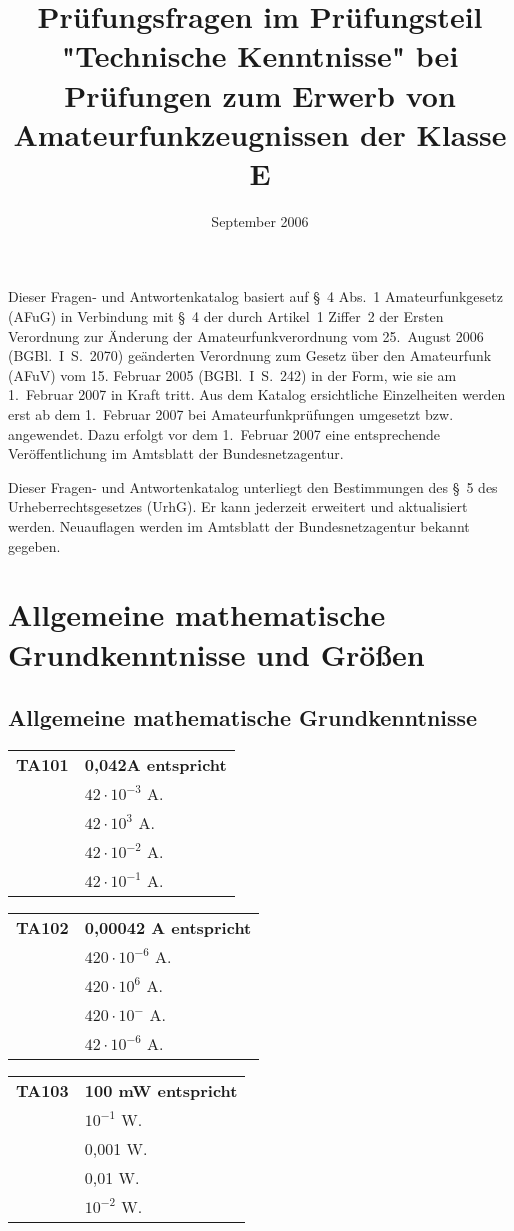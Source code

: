 \documentclass[
  ngerman,
  paper=a4,
  10pt,
  headings=small,
  DIV=15,
]{scrartcl}
\title{Prüfungsfragen im Prüfungsteil "Technische Kenntnisse" bei Prüfungen zum Erwerb von Amateurfunkzeugnissen der Klasse E}
\date{September 2006}
\makeatletter
\newenvironment{question}[2]{
  \noindent
  \setcounter{answer}{1}
  \begin{tabular}{@{}cp{6.5cm}@{}}
  \textbf{#1} & \textbf{#2}\\
}{
  \end{tabular}
  \bigskip
}
\newcounter{answer}
\newcommand{\answer}[1]{
  \textbf{\Alph{answer}}
  \stepcounter{answer}
  & #1\\}
\makeatother
\begin{document}
  \maketitle
    
  \newpage
  \vspace*{\fill}
  \noindent
  Dieser Fragen- und Antwortenkatalog basiert auf §~4 Abs.~1 Amateurfunkgesetz (AFuG) in Verbindung mit §~4 der durch Artikel~1 Ziffer~2 der Ersten Verordnung zur Änderung der Amateurfunkverordnung vom 25.~August 2006 (BGBl.~I~S.~2070) geänderten Verordnung zum Gesetz über den Amateurfunk (AFuV) vom 15. Februar 2005 (BGBl.~I~S.~242) in der Form, wie sie am 1.~Februar 2007 in Kraft tritt. Aus dem Katalog ersichtliche Einzelheiten werden erst ab dem 1.~Februar 2007 bei Amateurfunkprüfungen umgesetzt bzw. angewendet. Dazu erfolgt vor dem 1.~Februar 2007 eine entsprechende Veröffentlichung im Amtsblatt der Bundesnetzagentur.
  
Dieser Fragen- und Antwortenkatalog unterliegt den Bestimmungen des §~5 des Urheberrechtsgesetzes (UrhG).
Er kann jederzeit erweitert und aktualisiert werden. Neuauflagen werden im Amtsblatt der Bundesnetzagentur bekannt gegeben.
  \newpage
  \tableofcontents
  \twocolumn
  \section{Allgemeine mathematische Grundkenntnisse und Größen}
  \subsection{Allgemeine mathematische Grundkenntnisse}
  
  \begin{question}{TA101}{0,042A entspricht}
    \answer{$42 \cdot 10^{-3}$ A.}
    \answer{$42 \cdot 10^3$ A.}
    \answer{$42 \cdot 10^{-2}$ A.}
    \answer{$42 \cdot 10^{-1}$ A.}
  \end{question}
  
  \begin{question}{TA102}{0,00042 A entspricht}
    \answer{$420 \cdot 10^{-6}$ A.}
    \answer{$420 \cdot 10^{6}$ A.}
    \answer{$420 \cdot 10^{-}$ A.}
    \answer{$42 \cdot 10^{-6}$ A.}
  \end{question}
  
  \begin{question}{TA103}{100 mW entspricht}
    \answer{$10^{-1}$ W.}
    \answer{0,001 W.}
    \answer{0,01 W.}
    \answer{$10^{-2}$ W.}
  \end{question}
  
\end{document}
